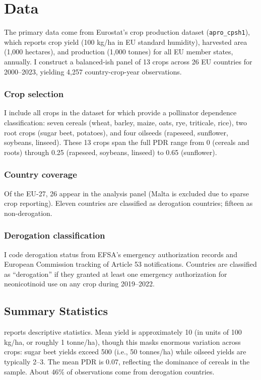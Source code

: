 \documentclass[12pt]{article}
\begin{document}
\section{Data}

The primary data come from Eurostat's crop production dataset (\texttt{apro\_cpsh1}), which reports crop yield (100 kg/ha in EU standard humidity), harvested area (1,000 hectares), and production (1,000 tonnes) for all EU member states, annually. I construct a balanced-ish panel of 13 crops across 26 EU countries for 2000--2023, yielding 4,257 country-crop-year observations.

\subsubsection*{Crop selection} I include all crops in the dataset for which \citet{klein2007importance} provide a pollinator dependence classification: seven cereals (wheat, barley, maize, oats, rye, triticale, rice), two root crops (sugar beet, potatoes), and four oilseeds (rapeseed, sunflower, soybeans, linseed). These 13 crops span the full PDR range from 0 (cereals and roots) through 0.25 (rapeseed, soybeans, linseed) to 0.65 (sunflower).

\subsubsection*{Country coverage} Of the EU-27, 26 appear in the analysis panel (Malta is excluded due to sparse crop reporting). Eleven countries are classified as derogation countries; fifteen as non-derogation.

\subsubsection*{Derogation classification} I code derogation status from EFSA's emergency authorization records and European Commission tracking of Article 53 notifications. Countries are classified as ``derogation'' if they granted at least one emergency authorization for neonicotinoid use on any crop during 2019--2022.

\subsection{Summary Statistics}



 reports descriptive statistics. Mean yield is approximately 10 (in units of 100 kg/ha, or roughly 1 tonne/ha), though this masks enormous variation across crops: sugar beet yields exceed 500 (i.e., 50 tonnes/ha) while oilseed yields are typically 2--3. The mean PDR is 0.07, reflecting the dominance of cereals in the sample. About 46\% of observations come from derogation countries.
\end{document}
